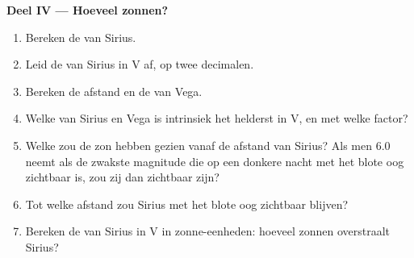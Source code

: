 \begin{problem}
\medskip
\noindent\textbf{Deel IV --- Hoeveel zonnen?}
\begin{enumerate}[resume]
  \item Bereken de  van Sirius.
  \item Leid de  van Sirius in V af, op twee decimalen.
  \item Bereken de afstand en de  van Vega.
  \item Welke van Sirius en Vega is intrinsiek het helderst in V, en met welke factor?
  \item Welke  zou de zon hebben gezien vanaf de afstand van Sirius? Als men 6.0
        neemt als de zwakste magnitude die op een donkere nacht met het blote oog zichtbaar is, zou
        zij dan zichtbaar zijn?
  \item Tot welke afstand zou Sirius met het blote oog zichtbaar blijven?
  \item Bereken de  van Sirius in V in zonne-eenheden: hoeveel zonnen overstraalt Sirius?
\end{enumerate}
\end{problem}
